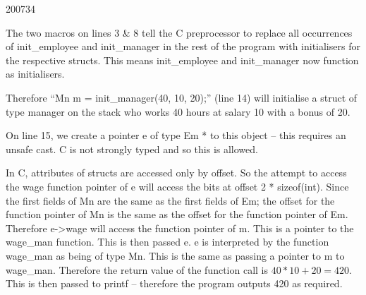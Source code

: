 \documentclass[10pt,\jkfside,a4paper]{article}
\begin{document}
\begin{examquestion}{2007}{3}{4}
\begin{enumerate}[label=(\alph*)]
The two macros on lines 3 \& 8 tell the C preprocessor to replace all
occurrences of init\_employee and init\_manager in the rest of the program
with initialisers for the respective structs. This means init\_employee and
init\_manager now function as initialisers.

Therefore ``Mn m = init\_manager(40, 10, 20);'' (line 14) will initialise a
struct of type manager on the stack who works 40 hours at salary 10 with a
bonus of 20.

On line 15, we create a pointer e of type Em * to this object -- this requires
an unsafe cast. C is not strongly typed and so this is allowed.

In C, attributes of structs are accessed only by offset. So the attempt to
access the wage function pointer of e will access the bits at offset 2 *
sizeof(int). Since the first fields of Mn are the same as the first
fields of Em; the offset for the function pointer of Mn is the same as the
offset for the function pointer of Em. Therefore e->wage will access the
function pointer of m. This is a pointer to the wage\_man function. This is
then passed e. e is interpreted by the function wage\_man as being of type
Mn. This is the same as passing a pointer to m to wage\_man. Therefore the
return value of the function call is $40*10 + 20 = 420$. This is then passed
to printf -- therefore the program outputs 420 as required.

\end{enumerate}

\end{examquestion}
\end{document}
